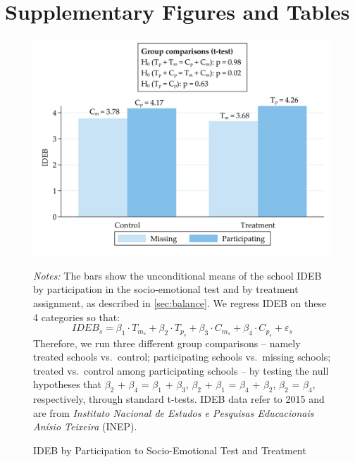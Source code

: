 \documentclass[11pt,a4paper]{article}
\begin{document}
\clearpage


\clearpage
\appendix
	
\section{Supplementary Figures and Tables}
\setcounter{figure}{0}
\setcounter{table}{0}
\renewcommand{\thefigure}{A\arabic{figure}}
\renewcommand{\thetable}{A\arabic{table}}
\label{app:tables_figures}

\null
\vfill
\begin{figure}[ht!]
    \caption{IDEB by Participation to Socio-Emotional Test and Treatment}
    \label{fig:predict_participation}
    \centering

    \includegraphics[width=14cm]{DataWork/Output/Figures/figA1_predict_participation.png}
    
    \noindent
    \justifying
    \small{\textit{Notes:} The bars show the unconditional means of the school IDEB by participation in the socio-emotional test and by treatment assignment, as described in \ref{sec:balance}. We regress IDEB on these 4 categories so that:
    \begin{equation*}
        IDEB_s = \beta_1 \cdot T_{m_s} + \beta_2 \cdot T_{p_s} + \beta_3 \cdot C_{m_s} + \beta_4 \cdot C_{p_s} + \varepsilon_s
    \end{equation*}
    Therefore, we run three different group comparisons -- namely treated schools vs.\ control; participating schools vs.\ missing schools; treated vs.\ control among participating schools -- by testing the null hypotheses that $\beta_2$ + $\beta_4$ = $\beta_1$ + $\beta_3$, $\beta_2$ + $\beta_1$ = $\beta_4$ + $\beta_2$, $\beta_2$ = $\beta_4$, respectively, through standard t-tests. IDEB data refer to 2015 and are from \textit{Instituto Nacional de Estudos e Pesquisas Educacionais Anísio Teixeira} (INEP).}
\end{figure}
\vfill
\end{document}
